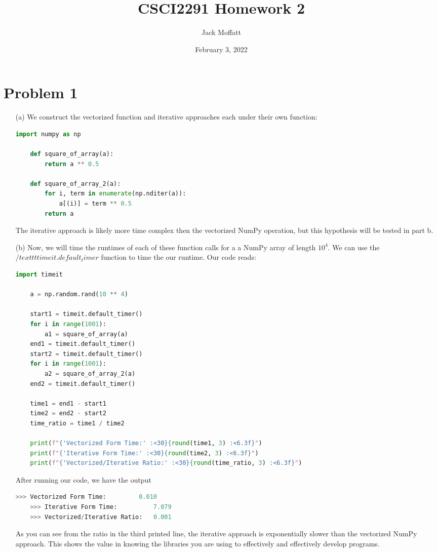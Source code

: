 \documentclass[12pt, letterpaper]{article}
\title{CSCI2291 Homework 2}
\author{Jack Moffatt}
\date{February 3, 2022}
\begin{document}
\maketitle
\noindent\makebox[\linewidth]{\rule{18cm}{0.4pt}}

\section*{Problem 1}
\begin{enumerate}
    \item [(a)] We construct the vectorized function and iterative approaches 
    each under their own function:
\begin{lstlisting}[language=python]
    import numpy as np

    def square_of_array(a):
        return a ** 0.5

    def square_of_array_2(a):
        for i, term in enumerate(np.nditer(a)):
            a[(i)] = term ** 0.5
        return a
\end{lstlisting}
    The iterative approach is likely more time complex then the vectorized NumPy
    operation, but this hypothesis will be tested in part b.
    \item [(b)] Now, we will time the runtimes of each of these function calls for a 
    a NumPy array of length $10^4$. We can use the $/texttt{timeit.default_timer}$ 
    function to time the our runtime. Our code reads: 
\begin{lstlisting}[language=python]
    import timeit

    a = np.random.rand(10 ** 4)

    start1 = timeit.default_timer()
    for i in range(1001):   
        a1 = square_of_array(a)
    end1 = timeit.default_timer()
    start2 = timeit.default_timer()
    for i in range(1001):
        a2 = square_of_array_2(a)
    end2 = timeit.default_timer()

    time1 = end1 - start1
    time2 = end2 - start2
    time_ratio = time1 / time2

    print(f"{'Vectorized Form Time:' :<30}{round(time1, 3) :<6.3f}")
    print(f"{'Iterative Form Time:' :<30}{round(time2, 3) :<6.3f}")
    print(f"{'Vectorized/Iterative Ratio:' :<30}{round(time_ratio, 3) :<6.3f}")
\end{lstlisting}
    After running our code, we have the output 
\begin{lstlisting}[language=python]
    >>> Vectorized Form Time:         0.010
    >>> Iterative Form Time:          7.079 
    >>> Vectorized/Iterative Ratio:   0.001 
\end{lstlisting}
As you can see from the ratio in the third printed line, the iterative approach 
is exponentially slower than the vectorized NumPy approach. This shows the value 
in knowing the libraries you are using to effectively and effectively develop programs. 
\end{enumerate} 
\noindent\makebox[\linewidth]{\rule{18cm}{0.4pt}}
\end{document}
